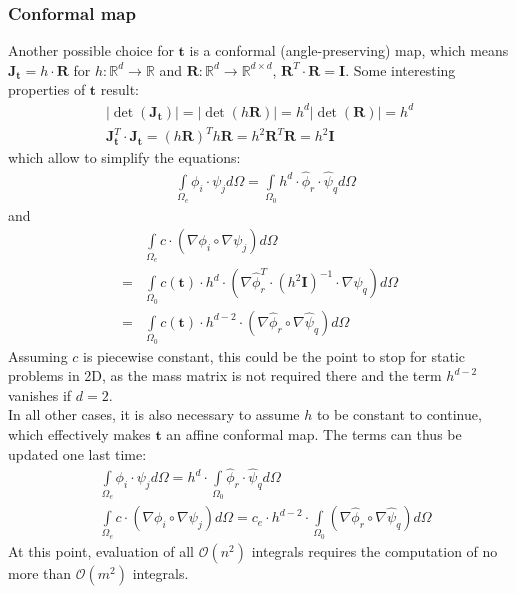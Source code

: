 \documentclass{IOS-Book-Article}
\theoremstyle{plain}
\theoremstyle{definition}
\begin{document}
\subsubsection{Conformal map}

Another possible choice for $\mathbf t$ is a conformal (angle-preserving) map, which means $\mathbf J_{\mathbf t} = h \cdot \mathbf R$ for $h : \mathbb{R}^d \rightarrow \mathbb{R}$ and $\mathbf R : \mathbb{R}^d \rightarrow \mathbb{R}^{d \times d}$, $\mathbf R^T \cdot \mathbf R = \mathbf I$. Some interesting properties of $\mathbf t$ result:
\begin{align}
	\left| \det(\mathbf J_{\mathbf t}) \right | = \left| \det(h \mathbf R) \right | = h^d \left| \det(\mathbf R) \right | = h^d \\
	\mathbf J_{\mathbf t}^T \cdot \mathbf J_{\mathbf t} = (h \mathbf R)^T h \mathbf R = h^2 \mathbf R^T \mathbf R = h^2 \mathbf I
\end{align}
which allow to simplify the equations:
\begin{align*}
	& \int \limits_{\Omega_e} \phi_i \cdot \psi_j d\Omega = \int \limits_{\Omega_0} h^d \cdot \hat \phi_r \cdot \hat \psi_q d\Omega
\end{align*}
and
\begin{align*}
	& \int \limits_{\Omega_e} c \cdot (\nabla \phi_i \circ \nabla \psi_j) d\Omega \\
	=& \int \limits_{\Omega_0} c( \mathbf t ) \cdot h^d \cdot (\nabla \hat \phi_r^T \cdot (h^2 \mathbf I)^{-1} \cdot \nabla \hat \psi_q) d\Omega \\
	=& \int \limits_{\Omega_0} c( \mathbf t ) \cdot h^{d-2} \cdot (\nabla \hat \phi_r \circ \nabla \hat \psi_q) d\Omega
\end{align*}
Assuming $c$ is piecewise constant, this could be the point to stop for static problems in 2D, as the mass matrix is not required there and the term $h^{d-2}$ vanishes if $d = 2$.\\
In all other cases, it is also necessary to assume $h$ to be constant to continue, which effectively makes $\mathbf t$ an affine conformal map. The terms can thus be updated one last time:
\begin{align*}
	& \int \limits_{\Omega_e} \phi_i \cdot \psi_j d\Omega = h^d \cdot \int \limits_{\Omega_0} \hat \phi_r \cdot \hat \psi_q d\Omega \\
	& \int \limits_{\Omega_e} c \cdot (\nabla \phi_i \circ \nabla \psi_j) d\Omega = c_e \cdot h^{d-2} \cdot \int \limits_{\Omega_0} (\nabla \hat \phi_r \circ \nabla \hat \psi_q) d\Omega
\end{align*}
At this point, evaluation of all $\mathcal O(n^2)$ integrals requires the computation of no more than $\mathcal O(m^2)$ integrals.
\end{document}
